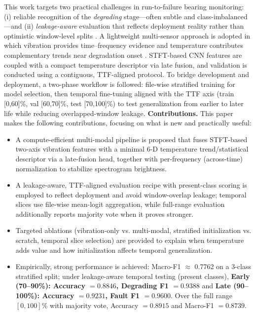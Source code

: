 \documentclass[pdflatex,sn-mathphys-num]{sn-jnl}%
\begin{document}
This work targets two practical challenges in run-to-failure bearing monitoring: (i) reliable recognition of the \emph{degrading} stage—often subtle and class-imbalanced—and (ii) \emph{leakage-aware} evaluation that reflects deployment reality rather than optimistic window-level splits \cite{jung2024dib_rtf,kaufman2012leakage,bergmeir2012timeseriescv}. A lightweight multi-sensor approach is adopted in which vibration provides time--frequency evidence and temperature contributes complementary trends near degradation onset \cite{baltrusaitis2019multimodal}. STFT-based CNN features are coupled with a compact temperature descriptor via late fusion, and validation is conducted using a contiguous, TTF-aligned protocol.
To bridge development and deployment, a two-phase workflow is followed: file-wise stratified training for model selection, then temporal fine-tuning aligned with the TTF axis (train [0,60]\%, val [60,70]\%, test [70,100]\%) to test generalization from earlier to later life while reducing overlapped-window leakage.
\textbf{Contributions.} This paper makes the following contributions, focusing on what is new and practically useful:
\begin{itemize}
    \item A compute-efficient multi-modal pipeline is proposed that fuses STFT-based two-axis vibration features with a minimal 6-D temperature trend/statistical descriptor via a late-fusion head, together with per-frequency (across-time) normalization to stabilize spectrogram brightness.
    \item A leakage-aware, TTF-aligned evaluation recipe with present-class scoring is employed to reflect deployment and avoid window-overlap leakage; temporal slices use file-wise mean-logit aggregation, while full-range evaluation additionally reports majority vote when it proves stronger.
    \item Targeted ablations (vibration-only vs. multi-modal, stratified initialization vs. scratch, temporal slice selection) are provided to explain when temperature adds value and how initialization affects temporal generalization.
    \item Empirically, strong performance is achieved: Macro-F1 $\approx$ 0.7762 on a 3-class stratified split; under leakage-aware temporal testing (present classes), \textbf{Early (70--90\%): Accuracy $=0.8846$, Degrading F1 $=0.9388$} and \textbf{Late (90--100\%): Accuracy $=0.9231$, Fault F1 $=0.9600$}. Over the full range $[0,100]\%$ with majority vote, Accuracy $=0.8915$ and Macro-F1 $=0.8739$.
\end{itemize}
\end{document}
